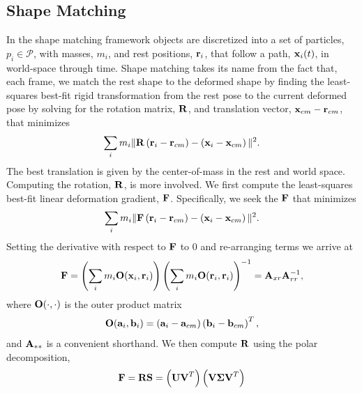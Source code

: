 \documentclass[review]{acmsiggraph}
\begin{document}
\subsection{Shape Matching}
\label{sec:ShapeMatching}
In the shape matching framework
objects are discretized into a set of particles, $p_i\in\mathcal{P}$, with masses, $m_i$, and rest positions, $\mathit{\mathbf{r}}_i$, 
that follow a path, $\mathit{\mathbf{x}}_i(t)$, in world-space through time.  
Shape matching takes its name from the fact that, each frame, we match the rest shape to 
the deformed shape by finding
the least-squares best-fit rigid transformation from the rest pose
to the current deformed pose by
solving for the rotation matrix, $\mathit{\mathbf{R}}$, and translation
vector, $\mathit{\mathbf{x}}_{cm}-\mathit{\mathbf{r}}_{cm}$, that minimizes
\begin{equation}
\label{eq:sm}
\sum_i m_i \| \mathit{\mathbf{R}}\left(\mathit{\mathbf{r}}_i - \mathit{\mathbf{r}}_{cm}\right)-\left(\mathit{\mathbf{x}}_i-\mathit{\mathbf{x}}_{cm}\right)\|^2.
\end{equation}
The best translation is given by the center-of-mass in the rest and world space.  
Computing the rotation, $\mathit{\mathbf{R}}$, is more involved.  
We first compute the least-squares best-fit linear deformation gradient, $\mathit{\mathbf{F}}$.
Specifically, we seek the $\mathit{\mathbf{F}}$ that minimizes
\begin{equation}
\sum_i m_i \| \mathit{\mathbf{F}}\left(\mathit{\mathbf{r}}_i - \mathit{\mathbf{r}}_{cm}\right)-\left(\mathit{\mathbf{x}}_i-\mathit{\mathbf{x}}_{cm}\right)\|^2.
\end{equation}
Setting the derivative with respect to $\mathit{\mathbf{F}}$ to $0$ and re-arranging terms we arrive at
\begin{equation}
\label{eq:defgrad}
\mathit{\mathbf{F}} = \left(\sum_i m_i \mathit{\mathbf{O}}(\mathit{\mathbf{x}}_i,\mathit{\mathbf{r}}_i)\right)\left(\sum_im_i\mathit{\mathbf{O}}(\mathit{\mathbf{r}}_i,\mathit{\mathbf{r}}_i)\right)^{-1} = \mathit{\mathbf{A}}_{xr}\mathit{\mathbf{A}}_{rr}^{-1},
\end{equation}
where $\mathit{\mathbf{O}}(\cdot,\cdot)$ is the outer product matrix
\begin{equation}
\mathit{\mathbf{O}}(\mathit{\mathbf{a}}_i,\mathit{\mathbf{b}}_i) = \left(\mathit{\mathbf{a}}_i-\mathit{\mathbf{a}}_{cm}\right)\left(\mathit{\mathbf{b}}_{i}-\mathit{\mathbf{b}}_{cm}\right)^T,
\end{equation}
and $\mathit{\mathbf{A}}_{**}$ is a convenient shorthand.
We then compute $\mathit{\mathbf{R}}$ using the polar decomposition,
\begin{equation}
\label{eq:decomp}
\mathit{\mathbf{F}} = \mathit{\mathbf{R}}\mathit{\mathbf{S}} = \left(\mathit{\mathbf{UV}}^T\right)\left(\mathit{\mathbf{V\Sigma V}}^T\right)
\end{equation}
\end{document}
